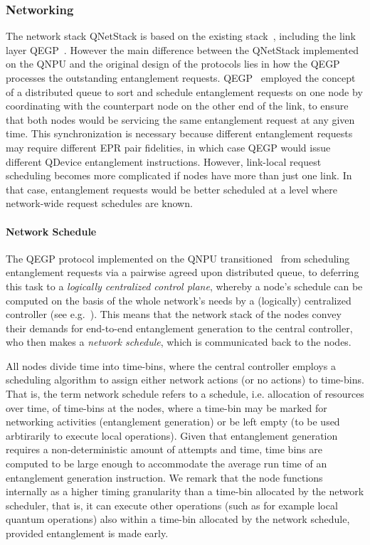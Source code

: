 \subsubsection{Networking}
\label{sec:arch-networking}

The network stack \ac{QNetStack} is based on the existing stack~\cite{dahlberg_2019_egp}, including the link layer \ac{QEGP}~\cite{dahlberg_2019_egp}.
However the main difference between the \ac{QNetStack} implemented on the \ac{QNPU} and the original design of the protocols lies in how the \ac{QEGP} processes the outstanding entanglement requests. \ac{QEGP}~\cite{dahlberg_2019_egp} employed the concept of a distributed queue to sort and schedule entanglement requests on one node by coordinating with the counterpart node on the other end of the link, to ensure that both nodes would be servicing the same entanglement request at any given time. This synchronization is necessary because different entanglement requests may require different \ac{EPR} pair fidelities, in which case \ac{QEGP} would issue different \ac{QDevice} entanglement instructions. However, link-local request scheduling becomes more complicated if nodes have more than just one link. In that case, entanglement requests would be better scheduled at a level where network-wide request schedules are known. 

\paragraph{Network Schedule}
The \ac{QEGP} protocol implemented on the \ac{QNPU} transitioned~\cite{pompili_2022_experimental} from scheduling entanglement requests via a pairwise agreed upon distributed queue, to deferring this task to a \emph{logically centralized control plane}, whereby a node's schedule can be computed on the basis of the whole network's needs by a (logically) centralized controller (see e.g.~\cite{skrzypczyk_2021_arch}). This means that the network stack of the nodes convey their demands for end-to-end entanglement generation to the central controller, who then makes a \emph{network schedule}, which is communicated back to the nodes. 

All nodes divide time into time-bins, where the central controller employs a scheduling algorithm to assign either network actions (or no actions) to time-bins. That is, the term network schedule refers to a schedule, i.e. allocation of resources over time, of time-bins at the nodes, where a time-bin may be marked for networking activities (entanglement generation) or be left empty (to be used arbtirarily to execute local operations). 
Given that entanglement generation requires a non-deterministic amount of attempts and time, time bins are computed to be large enough to accommodate the average run time of an entanglement generation instruction. 
We remark that the node functions internally as a higher timing granularity than a time-bin allocated by the network scheduler, that is, it can execute other operations (such as for example local quantum operations) also within a time-bin allocated by the network schedule, provided entanglement is made early.

